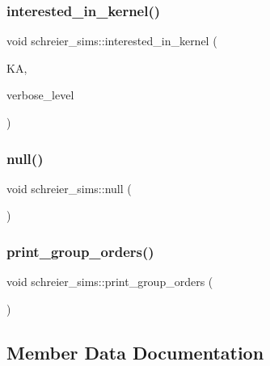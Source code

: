 \subsubsection{\texorpdfstring{interested\+\_\+in\+\_\+kernel()}{interested\_in\_kernel()}}
{\footnotesize\ttfamily void schreier\+\_\+sims\+::interested\+\_\+in\+\_\+kernel (\begin{DoxyParamCaption}\item[{\mbox{\hyperlink{classaction}{action}} $\ast$}]{KA,  }\item[{\mbox{\hyperlink{galois_8h_a09fddde158a3a20bd2dcadb609de11dc}{I\+NT}}}]{verbose\+\_\+level }\end{DoxyParamCaption})}

\mbox{\label{classschreier__sims_a395d07da6c3092bba6c4b3c43a5d84f0}} 
\subsubsection{\texorpdfstring{null()}{null()}}
{\footnotesize\ttfamily void schreier\+\_\+sims\+::null (\begin{DoxyParamCaption}{ }\end{DoxyParamCaption})}

\mbox{\label{classschreier__sims_ae4e882d0ce297dfede06520229e1de50}} 
\subsubsection{\texorpdfstring{print\+\_\+group\+\_\+orders()}{print\_group\_orders()}}
{\footnotesize\ttfamily void schreier\+\_\+sims\+::print\+\_\+group\+\_\+orders (\begin{DoxyParamCaption}{ }\end{DoxyParamCaption})}



\subsection{Member Data Documentation}
\mbox{\label{classschreier__sims_a48bf8140c25d70a5b0b9de77695f310b}} 
